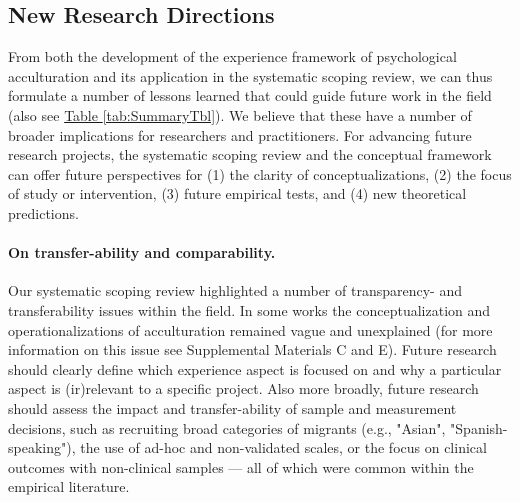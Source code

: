 \documentclass[man, 12pt, a4paper, mask]{apa7}
\newcommand{\tblref}[2][]{\hyperref[#2]{Table \ref*{#2}#1}}
\begin{document}
\subsection{New Research Directions}
From both the development of the experience framework of psychological acculturation and its application in the systematic scoping review, we can thus formulate a number of lessons learned that could guide future work in the field (also see \tblref{tab:SummaryTbl}). We believe that these have a number of broader implications for researchers and practitioners.
For advancing future research projects, the systematic scoping review and the conceptual framework can offer future perspectives for (1) the clarity of conceptualizations, (2) the focus of study or intervention, (3) future empirical tests, and (4) new theoretical predictions. 

\paragraph{On transfer-ability and comparability.} Our systematic scoping review highlighted a number of transparency- and transferability issues within the field. In some works the conceptualization and operationalizations of acculturation remained vague and unexplained (for more information on this issue see Supplemental Materials C and E). Future research should clearly define which experience aspect is focused on and why a particular aspect is (ir)relevant to a specific project. Also more broadly, future research should assess the impact and transfer-ability of sample and measurement decisions, such as recruiting broad categories of migrants (e.g., "Asian", "Spanish-speaking"), the use of ad-hoc and non-validated scales, or the focus on clinical outcomes with non-clinical samples --- all of which were common within the empirical literature.


\end{document}
